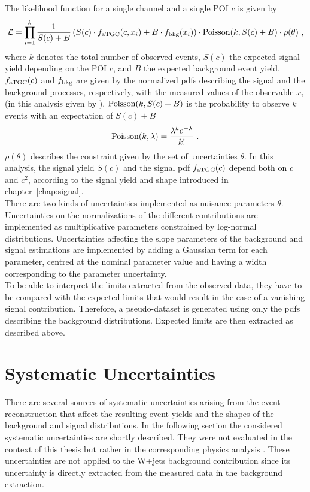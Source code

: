 \noindent The likelihood function for a single channel and a single POI $c$ is given by
\begin{equation}
\mathcal{L} = \prod_{i=1}^k  \frac{1}{S(c)+B} \left(S(c)\cdot f_{\rm aTGC}(c,x_i) + B\cdot f_{\rm bkg}(x_i) 	\right) \cdot {\rm Poisson}(k,S(c)+B) \cdot \rho(\theta)~,
\end{equation}
where $k$ denotes the total number of observed events, $S(c)$ the expected signal yield depending on the POI $c$, and $B$ the expected background event yield. $f_{\rm aTGC}(c)$ and $f_{\rm bkg}$ are given by the normalized pdfs describing the signal and the background processes, respectively, with the measured values of the observable $x_i$ (in this analysis given by \MWV). ${\rm Poisson}(k,S(c)+B)$ is the probability to observe $k$ events with an expectation of $S(c)+B$
\begin{equation}
{\rm Poisson}(k,\lambda) = \frac{\lambda^k e^{-\lambda}}{k!} ~.
\end{equation}
$\rho(\theta)$ describes the constraint given by the set of uncertainties $\theta$. In this analysis, the signal yield $S(c)$ and the signal pdf $f_{\rm aTGC}(c)$ depend both on $c$ and $c^2$, according to the signal yield and shape introduced in chapter~\ref{chap:signal}.\\

\noindent There are two kinds of uncertainties implemented as nuisance parameters $\theta$. Uncertainties on the normalizations of the different contributions are implemented as multiplicative parameters constrained by log-normal distributions. Uncertainties affecting the slope parameters of the background and signal estimations are implemented by adding a Gaussian term for each parameter, centred at the nominal parameter value and having a width corresponding to the parameter uncertainty.\\

\noindent To be able to interpret the limits extracted from the observed data, they have to be compared with the expected limits that would result in the case of a vanishing signal contribution. Therefore, a pseudo-dataset is generated using only the pdfs describing the background distributions. Expected limits are then extracted as described above.


\section{Systematic Uncertainties}
\label{sec:systematics}
There are several sources of systematic uncertainties arising from the event reconstruction that affect the resulting event yields and the shapes of the background and signal distributions. In the following section the considered systematic uncertainties are shortly described. They were not evaluated in the context of this thesis but rather in the corresponding physics analysis \cite{PAS}. These uncertainties are not applied to the W+jets background contribution since its uncertainty is directly extracted from the measured data in the background extraction.

